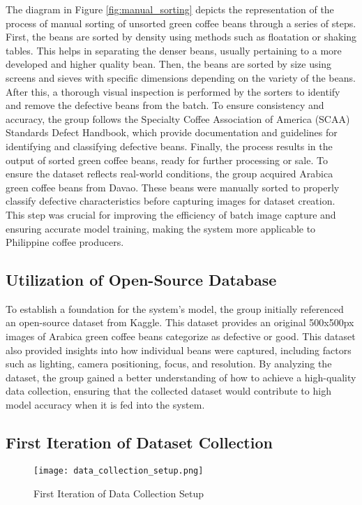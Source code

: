 The diagram in Figure \ref{fig:manual_sorting} depicts the representation of the process of manual sorting of unsorted green coffee beans through a series of steps. First, the beans are sorted by density using methods such as floatation or shaking tables. This helps in separating the denser beans, usually pertaining to a more developed and higher quality bean. Then, the beans are sorted by size using screens and sieves with specific dimensions depending on the variety of the beans. After this, a thorough visual inspection is performed by the sorters to identify and remove the defective beans from the batch. To ensure consistency and accuracy, the group follows the Specialty Coffee Association of America (SCAA) Standards Defect Handbook, which provide documentation and guidelines for identifying and classifying defective beans. Finally, the process results in the output of sorted green coffee beans, ready for further processing or sale. 
To ensure the dataset reflects real-world conditions, the group acquired Arabica green coffee beans from Davao. These beans were manually sorted to properly classify defective characteristics before capturing images for dataset creation. This step was crucial for improving the efficiency of batch image capture and ensuring accurate model training, making the system more applicable to Philippine coffee producers.

\subsection{Utilization of Open-Source Database}
To establish a foundation for the system's model, the group initially referenced an open-source dataset from Kaggle. This dataset provides an original 500x500px images of Arabica green coffee beans categorize as defective or good. This dataset also provided insights into how individual beans were captured, including factors such as lighting, camera positioning, focus, and resolution. By analyzing the dataset, the group gained a better understanding of how to achieve a high-quality data collection, ensuring that the collected dataset would contribute to high model accuracy when it is fed into the system.


\subsection{First Iteration of Dataset Collection}
\begin{figure}[H]
    \centering
    \texttt{[image: data\_collection\_setup.png]}
    \caption{First Iteration of Data Collection Setup}
    \label{fig:data_collection_setup}
\end{figure}

